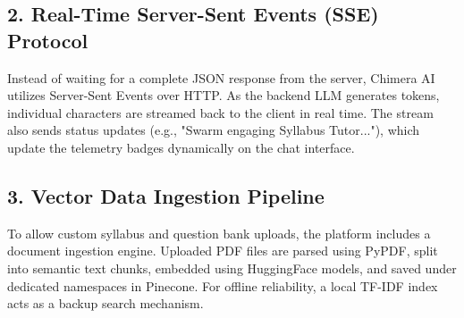\subsection{2. Real-Time Server-Sent Events (SSE) Protocol}
Instead of waiting for a complete JSON response from the server, Chimera AI utilizes Server-Sent Events over HTTP. As the backend LLM generates tokens, individual characters are streamed back to the client in real time. The stream also sends status updates (e.g., "Swarm engaging Syllabus Tutor..."), which update the telemetry badges dynamically on the chat interface.

\subsection{3. Vector Data Ingestion Pipeline}
To allow custom syllabus and question bank uploads, the platform includes a document ingestion engine. Uploaded PDF files are parsed using PyPDF, split into semantic text chunks, embedded using HuggingFace models, and saved under dedicated namespaces in Pinecone. For offline reliability, a local TF-IDF index acts as a backup search mechanism.

